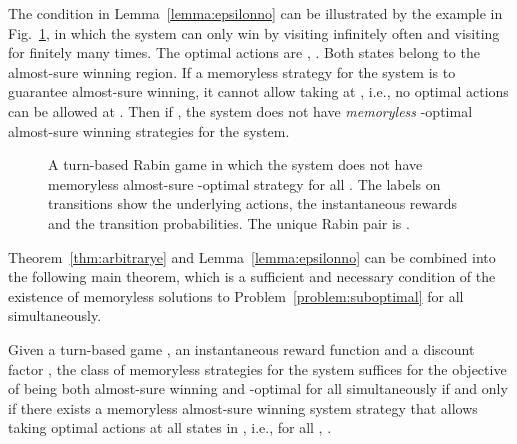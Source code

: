 \documentclass[runningheads,a4paper]{llncs}
\begin{document}
The condition in Lemma~\ref{lemma:epsilonno} can be illustrated by the example in Fig.~\ref{fig:counterexample}, in which the system can only win by visiting  infinitely often and visiting  for finitely many times. The optimal actions are , . 
Both states belong to the almost-sure winning region. If a memoryless strategy for the system is to guarantee almost-sure winning, it cannot allow taking  at , i.e., no optimal actions can be allowed at . 
Then if ,
the system does not have \emph{memoryless} -optimal almost-sure winning strategies for the system. 
\begin{figure}[t!]
\centering
{}
\caption{A turn-based Rabin game  in which the system does not have memoryless almost-sure -optimal strategy for all . The labels on transitions show the underlying actions, the instantaneous rewards and the transition probabilities. The unique Rabin pair is . }
\label{fig:counterexample}
\end{figure}







Theorem~\ref{thm:arbitrarye} and Lemma~\ref{lemma:epsilonno} can be combined into the following main theorem, which is a sufficient and necessary condition of the existence of memoryless solutions to Problem~\ref{problem:suboptimal} for all  simultaneously. 

\begin{theorem}
Given a turn-based game , an instantaneous reward function  and a discount factor , the class of memoryless strategies for the system suffices for the objective of being both almost-sure winning and -optimal for all  simultaneously if and only if there exists a memoryless almost-sure winning system strategy  that allows taking optimal actions at all states in , i.e., for all , .
\label{thm:main}
\end{theorem}
\end{document}
